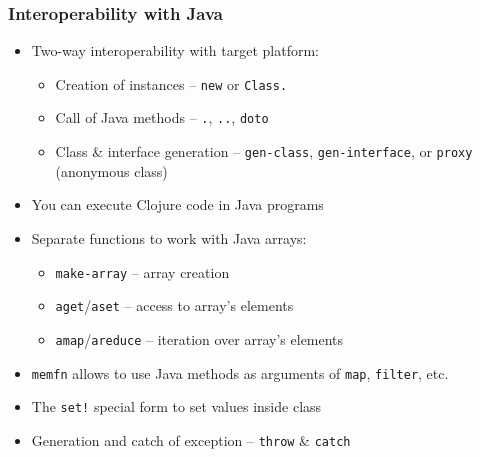 \begin{frame}[t]
  \frametitle{Interoperability with Java}
  \begin{itemize}
  \item Two-way interoperability with target platform:
    \begin{itemize}
    \item Creation of instances  -- \texttt{new} or \texttt{Class.}
    \item Call of Java methods -- \texttt{.}, \texttt{..}, \texttt{doto}
    \item Class \& interface generation -- \texttt{gen-class}, \texttt{gen-interface}, or
      \texttt{proxy} (anonymous class)
    \end{itemize}
  \item You can execute Clojure code in Java programs
  \item Separate functions to work with Java arrays:
    \begin{itemize}
    \item \texttt{make-array} -- array creation
    \item \texttt{aget}/\texttt{aset} -- access to array's elements
    \item \texttt{amap}/\texttt{areduce} -- iteration over array's elements
    \end{itemize}
  \item \texttt{memfn} allows to use Java methods as arguments of \texttt{map},
    \texttt{filter}, etc.
  \item The \texttt{set!} special form to set values inside class
  \item Generation and catch of exception -- \texttt{throw} \& \texttt{catch}
  \end{itemize}
\end{frame}


